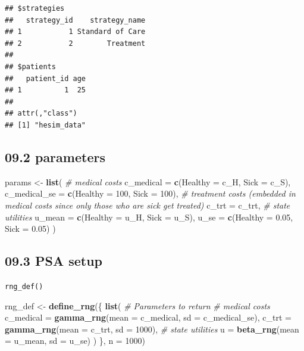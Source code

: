 \documentclass[
]{article}
\newenvironment{Shaded}{\begin{snugshade}}{\end{snugshade}}
\newcommand{\CommentTok}[1]{\textcolor[rgb]{0.56,0.35,0.01}{\textit{#1}}}
\newcommand{\DataTypeTok}[1]{\textcolor[rgb]{0.13,0.29,0.53}{#1}}
\newcommand{\DecValTok}[1]{\textcolor[rgb]{0.00,0.00,0.81}{#1}}
\newcommand{\FloatTok}[1]{\textcolor[rgb]{0.00,0.00,0.81}{#1}}
\newcommand{\KeywordTok}[1]{\textcolor[rgb]{0.13,0.29,0.53}{\textbf{#1}}}
\newcommand{\NormalTok}[1]{#1}
\newcommand{\StringTok}[1]{\textcolor[rgb]{0.31,0.60,0.02}{#1}}
\begin{document}
\begin{verbatim}
## $strategies
##   strategy_id    strategy_name
## 1           1 Standard of Care
## 2           2        Treatment
## 
## $patients
##   patient_id age
## 1          1  25
## 
## attr(,"class")
## [1] "hesim_data"
\end{verbatim}

\hypertarget{parameters}{%
\subsection{09.2 parameters}\label{parameters}}

\begin{Shaded}
\begin{Highlighting}[]
\NormalTok{params <-}\StringTok{ }\KeywordTok{list}\NormalTok{(}
  \CommentTok{# medical costs}
  \DataTypeTok{c_medical    =} \KeywordTok{c}\NormalTok{(}\DataTypeTok{Healthy =}\NormalTok{ c_H, }\DataTypeTok{Sick =}\NormalTok{ c_S),}
  \DataTypeTok{c_medical_se =} \KeywordTok{c}\NormalTok{(}\DataTypeTok{Healthy =} \DecValTok{100}\NormalTok{, }\DataTypeTok{Sick =} \DecValTok{100}\NormalTok{),}
  \CommentTok{# treatment costs (embedded in medical costs since only those who are sick get treated)}
  \DataTypeTok{c_trt  =}\NormalTok{ c_trt,}
  \CommentTok{# state utilities}
  \DataTypeTok{u_mean =} \KeywordTok{c}\NormalTok{(}\DataTypeTok{Healthy =}\NormalTok{ u_H,  }\DataTypeTok{Sick =}\NormalTok{ u_S),}
  \DataTypeTok{u_se   =} \KeywordTok{c}\NormalTok{(}\DataTypeTok{Healthy =} \FloatTok{0.05}\NormalTok{, }\DataTypeTok{Sick =} \FloatTok{0.05}\NormalTok{)}
\NormalTok{)}
\end{Highlighting}
\end{Shaded}

\hypertarget{psa-setup}{%
\subsection{09.3 PSA setup}\label{psa-setup}}

\texttt{rng\_def()}

\begin{Shaded}
\begin{Highlighting}[]
\NormalTok{rng_def <-}\StringTok{ }\KeywordTok{define_rng}\NormalTok{(\{}
  \KeywordTok{list}\NormalTok{( }\CommentTok{# Parameters to return}
    \CommentTok{# medical costs}
    \DataTypeTok{c_medical =} \KeywordTok{gamma_rng}\NormalTok{(}\DataTypeTok{mean =}\NormalTok{ c_medical, }\DataTypeTok{sd =}\NormalTok{ c_medical_se),}
    \DataTypeTok{c_trt     =} \KeywordTok{gamma_rng}\NormalTok{(}\DataTypeTok{mean =}\NormalTok{ c_trt,     }\DataTypeTok{sd =} \DecValTok{1000}\NormalTok{),}
    \CommentTok{# state utilities}
    \DataTypeTok{u =} \KeywordTok{beta_rng}\NormalTok{(}\DataTypeTok{mean =}\NormalTok{ u_mean, }\DataTypeTok{sd =}\NormalTok{ u_se)}
\NormalTok{  )}
\NormalTok{\}, }\DataTypeTok{n =} \DecValTok{1000}\NormalTok{)}
\end{Highlighting}
\end{Shaded}
\end{document}

